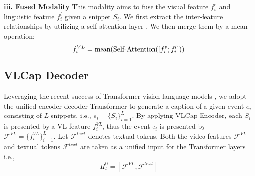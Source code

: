 \documentclass{article}
\begin{document}
\begin{table*}[!b]\centering
\caption{Performance comparison of \model with other SOTA models on YouCookII validation set.}
\label{tab:youcook}
\vspace{-5mm}
\end{table*}


\noindent
\textbf{iii. Fused Modality}
This modality aims to fuse the visual feature $f_i^e$ and linguistic feature $f_i^{l}$ given a snippet $S_i$. We first extract the inter-feature relationships by utilizing a self-attention layer \cite{vaswani2017attention}. We then merge them by a mean operation:
\vspace{-1.3mm}
\begin{equation}
    f_i^{VL} = \text{mean}(\text{Self-Attention}([f^v_i;f^l_i ]))
\vspace{-1.2mm}
\end{equation}

\vspace{-3mm}
\subsection{VLCap Decoder}
\vspace{-3mm}
Leveraging the recent success of Transformer vision-language models \cite{Chen2019uniter, lei2020mart}, we adopt the unified encoder-decoder Transformer to generate a caption of a given event $e_i$ consisting of $L$ snippets, i.e., $e_i = \{S_i\}_{i=1}^L$. By applying VLCap Encoder, each $S_i$ is presented by a VL feature $f_i^{VL}$, thus the event $e_i$ is presented by $\mathcal{F}^{VL} = \{f_i^{VL}\}^{L}_{i=1}$. Let $\mathcal{F}^{text}$ denotes textual tokens. Both the video features $\mathcal{F}^{VL}$ and textual tokens $\mathcal{F}^{text}$ are taken as a unified input for the Transformer layers i.e., 
\vspace{-2mm}
\begin{equation} 
H_t^0 = [\mathcal{F}^{VL}, \mathcal{F}^{text}]
\end{equation}
\end{document}
